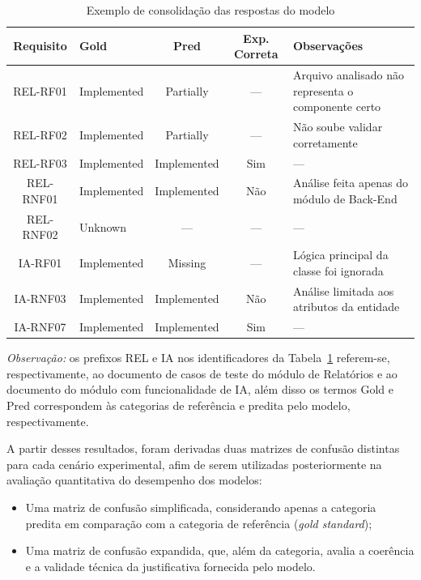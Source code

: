 \begin{table}[H]
\centering
\caption{Exemplo de consolidação das respostas do modelo}
\label{tab:exemplo-resultados}
\begin{tabular}{|c|l|c|c|p{5.5cm}|}
\hline
\textbf{Requisito} & \textbf{Gold} & \textbf{Pred} & \textbf{Exp. Correta} & \textbf{Observações} \\
\hline
REL-RF01  & Implemented & Partially   & --- & Arquivo analisado não representa o componente certo \\
REL-RF02  & Implemented & Partially   & --- & Não soube validar corretamente \\
\hline
REL-RF03  & Implemented & Implemented & Sim & --- \\
REL-RNF01 & Implemented & Implemented & Não & Análise feita apenas do módulo de Back-End \\
\hline
REL-RNF02 & Unknown     & ---         & --- & --- \\
IA-RF01   & Implemented & Missing     & --- & Lógica principal da classe foi ignorada \\
\hline
IA-RNF03  & Implemented & Implemented & Não & Análise limitada aos atributos da entidade \\
IA-RNF07  & Implemented & Implemented & Sim & --- \\
\hline
\end{tabular}
\end{table}

\noindent\textit{Observação:} os prefixos REL e IA nos identificadores da Tabela~\ref{tab:exemplo-resultados} referem-se, respectivamente, ao documento de casos de teste do módulo de Relatórios e ao documento do módulo com funcionalidade de IA, além disso os termos Gold e Pred correspondem às categorias de referência e predita pelo modelo, respectivamente.

A partir desses resultados, foram derivadas duas matrizes de confusão distintas para cada cenário experimental, afim de serem utilizadas posteriormente na avaliação quantitativa do desempenho dos modelos:
\begin{itemize}
    \item Uma matriz de confusão simplificada, considerando apenas a categoria predita em comparação com a categoria de referência (\textit{gold standard}); 
    \item Uma matriz de confusão expandida, que, além da categoria, avalia a coerência e a validade técnica da justificativa fornecida pelo modelo. 
\end{itemize}

